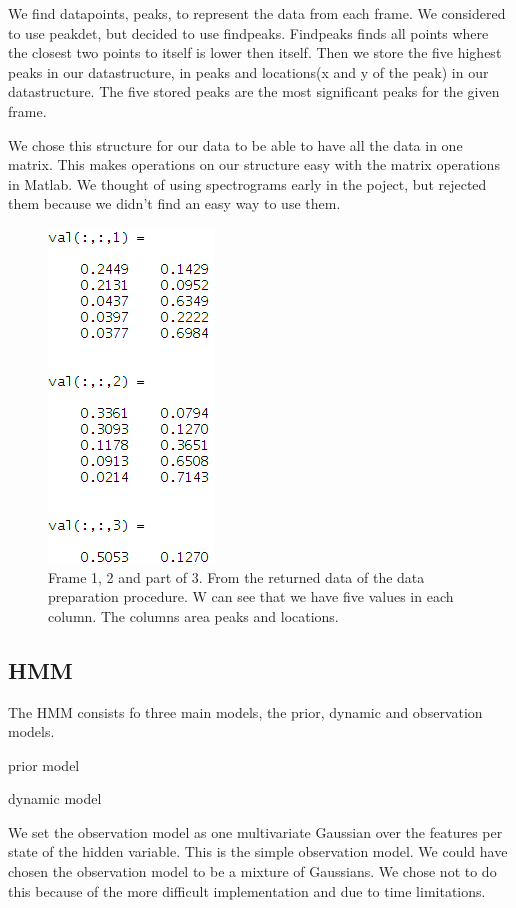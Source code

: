 \documentclass[titlepage]{article}
\begin{document}
We find datapoints, peaks, to represent the data from each frame. We considered to use peakdet, but decided to use findpeaks. Findpeaks finds all points where the closest two points to itself is lower then itself. Then we store the five highest peaks in our datastructure, in peaks and locations(x and y of the peak) in our datastructure. The five stored peaks are the most significant peaks for the given frame. 

We chose this structure for our data to be able to have all the data in one matrix. This makes operations on our structure easy with the matrix operations in Matlab. We thought of using spectrograms early in the poject, but rejected them because we didn't find an easy way to use them. 

\begin{figure}[Data Structure]
  \centering
    \includegraphics[height=60mm\textwidth]{data_part1}
  \caption{Frame 1, 2 and part of 3. From the returned data of the data preparation procedure. W can see that we have five values in each column. The columns area peaks and locations.}
\end{figure}

    \subsection{HMM}
The HMM consists fo three main models, the prior, dynamic and observation models. 

prior model

dynamic model 
  
We set the observation model as one multivariate Gaussian over the features per state of the hidden variable. This is the simple observation model. We could have chosen the observation model to be a mixture of Gaussians. We chose not to do this because of the more difficult implementation and due to time limitations. 
\end{document}
